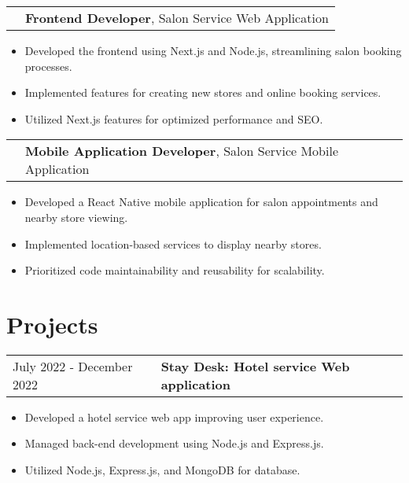 \documentclass{article}
\newenvironment{onecolentry}{\begin{itemize}[leftmargin=*,noitemsep,topsep=0pt,parsep=0pt,partopsep=0pt]}{\end{itemize}}
\newenvironment{twocolentry}[1]{\begin{tabularx}{\textwidth}{lX}#1 & }{\end{tabularx}\vspace{0.1cm}}
\newenvironment{highlights}{\begin{itemize}[leftmargin=*,noitemsep,topsep=0pt,parsep=0pt,partopsep=0pt,label=\textbullet]}{\end{itemize}}
\begin{document}
\begin{twocolentry}{
}
    \textbf{Frontend Developer}, Salon Service Web Application
\end{twocolentry}
\begin{onecolentry}
    \begin{highlights}
        \item Developed the frontend using Next.js and Node.js, streamlining salon booking processes.
        \item Implemented features for creating new stores and online booking services.
        \item Utilized Next.js features for optimized performance and SEO.
    \end{highlights}
\end{onecolentry}

\begin{twocolentry}{
}
    \textbf{Mobile Application Developer}, Salon Service Mobile Application
\end{twocolentry}
\begin{onecolentry}
    \begin{highlights}
        \item Developed a React Native mobile application for salon appointments and nearby store viewing.
        \item Implemented location-based services to display nearby stores.
        \item Prioritized code maintainability and reusability for scalability.
    \end{highlights}
\end{onecolentry}


\section{Projects}
\begin{twocolentry}{July 2022 - December 2022}
    \textbf{Stay Desk: Hotel service Web application}
\end{twocolentry}
\begin{onecolentry}
    \begin{highlights}
        \item Developed a hotel service web app improving user experience.
        \item Managed back-end development using Node.js and Express.js.
        \item Utilized Node.js, Express.js, and MongoDB for database.
    \end{highlights}
\end{onecolentry}
\end{document}
